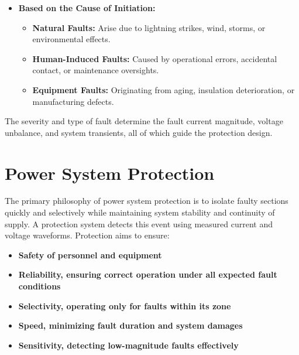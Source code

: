 \begin{itemize}
\item \textbf{Based on the Cause of Initiation:}
\begin{itemize}
\item \textbf{Natural Faults:} Arise due to lightning strikes, wind, storms, or environmental effects.
\item \textbf{Human-Induced Faults:} Caused by operational errors, accidental contact, or maintenance oversights.
\item \textbf{Equipment Faults:} Originating from aging, insulation deterioration, or manufacturing defects.
\end{itemize}
\end{itemize}



The severity and type of fault determine the fault current magnitude, voltage unbalance, and system transients, all of which guide the protection design.







 
 
 \section{Power System Protection}

The primary philosophy of power system protection is to isolate faulty sections quickly and selectively while maintaining system stability and continuity of supply. A protection system detects this event using measured current and voltage waveforms. Protection aims to ensure:

\begin{itemize}
\item \textbf{Safety of personnel and equipment}
\item \textbf{Reliability, ensuring correct operation under all expected fault conditions}
\item \textbf{Selectivity, operating only for faults within its zone}
\item \textbf{Speed, minimizing fault duration and system damages}
\item \textbf{Sensitivity, detecting low-magnitude faults effectively}
\end{itemize}

